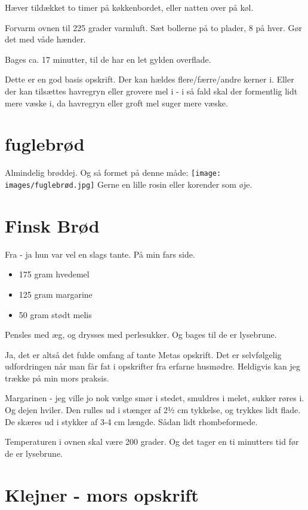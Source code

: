 \documentclass[
]{book}
\providecommand{\tightlist}{%
  \setlength{\itemsep}{0pt}\setlength{\parskip}{0pt}}
\begin{document}
Hæver tildækket to timer på køkkenbordet, eller natten over
på køl.

Forvarm ovnen til 225 grader varmluft. Sæt bollerne på to
plader, 8 på hver. Gør det med våde hænder.

Bages ca. 17 minutter, til de har en let gylden overflade.

Dette er en god basis opskrift. Der kan hældes flere/færre/andre
kerner i. Eller der kan tilsættes havregryn eller grovere
mel i - i så fald skal der formentlig lidt mere væske i, da
havregryn eller groft mel suger mere væske.

\hypertarget{fuglebruxf8d}{%
\section{fuglebrød}\label{fuglebruxf8d}}

Almindelig brøddej. Og så formet på denne måde:
\texttt{[image: images/fuglebrød.jpg]}
Gerne en lille rosin eller korender som øje.

\hypertarget{finsk-bruxf8d}{%
\section{Finsk Brød}\label{finsk-bruxf8d}}

Fra - ja hun var vel en slags tante. På min fars side.

\begin{itemize}
\tightlist
\item
  175 gram hvedemel
\item
  125 gram margarine
\item
  50 gram stødt melis
\end{itemize}

Pensles med æg, og drysses med perlesukker. Og bages til de er lysebrune.

Ja, det er altså det fulde omfang af tante Metas opskrift. Det er selvfølgelig udfordringen når man får fat i opskrifter fra erfarne husmødre. Heldigvis kan jeg trække på min mors praksis.

Margarinen - jeg ville jo nok vælge smør i stedet, smuldres i melet, sukker røres i. Og dejen hviler. Den rulles ud i stænger af 2½ cm tykkelse, og trykkes lidt flade. De skæres ud i stykker af 3-4 cm længde. Sådan lidt rhombeformede.

Temperaturen i ovnen skal være 200 grader. Og det tager en ti minutters tid før de er lysebrune.

\hypertarget{klejner---mors-opskrift}{%
\section{Klejner - mors opskrift}\label{klejner---mors-opskrift}}
\end{document}
